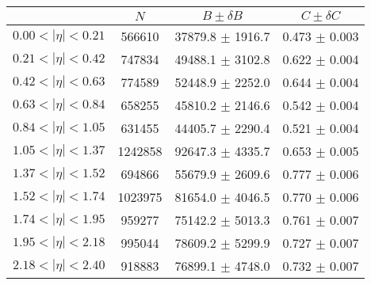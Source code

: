 \begin{tabular}{lccc}
\hline
    &   $N$   & $B \pm \delta B$  &  $C \pm \delta C$ \\
\hline
$0.00 < |\eta| <0.21$          & 566610     & 37879.8    $\pm$ 1916.7 & 0.473      $\pm$ 0.003 \\
$0.21 < |\eta| <0.42$          & 747834     & 49488.1    $\pm$ 3102.8 & 0.622      $\pm$ 0.004 \\
$0.42 < |\eta| <0.63$          & 774589     & 52448.9    $\pm$ 2252.0 & 0.644      $\pm$ 0.004 \\
$0.63 < |\eta| <0.84$          & 658255     & 45810.2    $\pm$ 2146.6 & 0.542      $\pm$ 0.004 \\
$0.84 < |\eta| <1.05$          & 631455     & 44405.7    $\pm$ 2290.4 & 0.521      $\pm$ 0.004 \\
$1.05 < |\eta| <1.37$          & 1242858    & 92647.3    $\pm$ 4335.7 & 0.653      $\pm$ 0.005 \\
$1.37 < |\eta| <1.52$          & 694866     & 55679.9    $\pm$ 2609.6 & 0.777      $\pm$ 0.006 \\
$1.52 < |\eta| <1.74$          & 1023975    & 81654.0    $\pm$ 4046.5 & 0.770      $\pm$ 0.006 \\
$1.74 < |\eta| <1.95$          & 959277     & 75142.2    $\pm$ 5013.3 & 0.761      $\pm$ 0.007 \\
$1.95 < |\eta| <2.18$          & 995044     & 78609.2    $\pm$ 5299.9 & 0.727      $\pm$ 0.007 \\
$2.18 < |\eta| <2.40$          & 918883     & 76899.1    $\pm$ 4748.0 & 0.732      $\pm$ 0.007 \\
\hline
\end{tabular}
